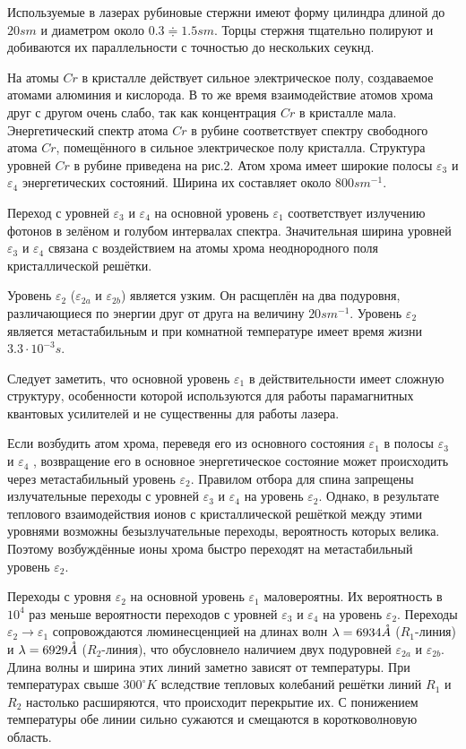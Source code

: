 \documentclass[a4paper,14pt,russian]{article}
\renewcommand{\AA}{\ensuremath{\mathring{A}}}
\begin{document}
Используемые в лазерах рубиновые стержни имеют форму цилиндра длиной до $20 sm$ и диаметром около $0.3 \Doteq 1.5 sm$. Торцы стержня тщательно полируют и добиваются их параллельности с точностью до нескольких сеукнд.

На атомы $Cr$ в кристалле действует сильное электрическое полу, создаваемое атомами алюминия и кислорода. В то же время взаимодействие атомов хрома друг с другом очень слабо, так как концентрация $Cr$ в кристалле мала. Энергетический спектр атома $Cr$ в рубине соответствует спектру свободного атома $Cr$, помещённого в сильное электрическое полу кристалла. Структура уровней $Cr$ в рубине приведена на рис.2. Атом хрома имеет широкие полосы $\varepsilon_3$ и $\varepsilon_4$ энергетических состояний. Ширина их составляет около $800 sm^{-1}$.



Переход с уровней $\varepsilon_3$ и $\varepsilon_4$ на основной уровень $\varepsilon_1$ соответствует излучению фотонов в зелёном и голубом интервалах спектра. Значительная ширина уровней $\varepsilon_3$ и $\varepsilon_4$ связана с воздействием на атомы хрома неоднородного поля кристаллической решётки.

Уровень $\varepsilon_2$ ($\varepsilon_{2a}$ и $\varepsilon_{2b}$) является узким. Он расщеплён на два подуровня, различающиеся по энергии друг от друга на величину $20 sm^{-1}$. Уровень $\varepsilon_2$ является метастабильным и при комнатной температуре имеет время жизни $3.3 \cdot 10^{-3} s$.

Следует заметить, что основной уровень $\varepsilon_1$ в действительности имеет сложную структуру, особенности которой используются для работы парамагнитных квантовых усилителей и не существенны для работы лазера.

Если возбудить атом хрома, переведя его из основного состояния $\varepsilon_1$ в полосы $\varepsilon_3$ и $\varepsilon_4$ , возвращение его в основное энергетическое состояние может происходить через метастабильный уровень $\varepsilon_2$. Правилом отбора для спина запрещены излучательные переходы с уровней $\varepsilon_3$ и $\varepsilon_4$ на уровень $\varepsilon_2$. Однако, в результате теплового взаимодействия ионов с кристаллической решёткой между этими уровнями возможны безызлучательные переходы, вероятность которых велика. Поэтому возбуждённые ионы хрома быстро переходят на метастабильный уровень $\varepsilon_2$.

Переходы с уровня $\varepsilon_2$ на основной уровень $\varepsilon_1$ маловероятны. Их вероятность в $10^4$ раз меньше вероятности переходов с уровней $\varepsilon_3$ и $\varepsilon_4$ на уровень $\varepsilon_2$. Переходы $\varepsilon_2 \to \varepsilon_1$ сопровождаются люминесценцией на длинах волн $\lambda = 6934 \text{\AA}$ ($R_1$-линия) и $\lambda = 6929 \text{\AA}$ ($R_2$-линия), что обусловнело наличием двух подуровней $\varepsilon_{2a}$ и $\varepsilon_{2b}$. Длина волны и ширина этих линий заметно зависят от температуры. При температурах свыше $300 ^\circ K$ вследствие тепловых колебаний решётки линий $R_1$ и $R_2$ настолько расширяются, что происходит перекрытие их. С понижением температуры обе линии сильно сужаются и смещаются в коротковолновую область.
\end{document}
